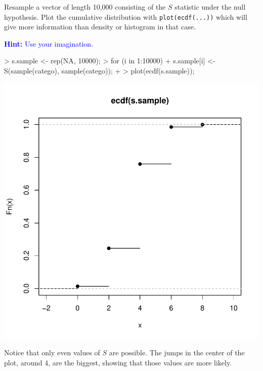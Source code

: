 \documentclass[a4paper]{article}
\theoremstyle{definition}
\begin{document}
\begin{Exercise}
Resample a vector of length 10,000 consisting of the $S$ statistic
under the null hypothesis. Plot the cumulative distribution with
\texttt{plot(ecdf(...))} which will give more information than density
or histogram in that case.
\par\noindent\textcolor{Blue}{\textbf{Hint:} Use your imagination.}
\end{Exercise}
\begin{Answer}
\begin{Schunk}
\begin{Sinput}
> s.sample <- rep(NA, 10000);
> for (i in 1:10000) {
+    s.sample[i] <- S(sample(catego), sample(catego));
+ }
> plot(ecdf(s.sample));
\end{Sinput}
\end{Schunk}
\includegraphics{fishertest-004}
\par
Notice that only even values of $S$ are possible. The jumps in the center
of the plot, around 4, are the biggest, showing that those values are more
likely.
\end{Answer}
\end{document}

